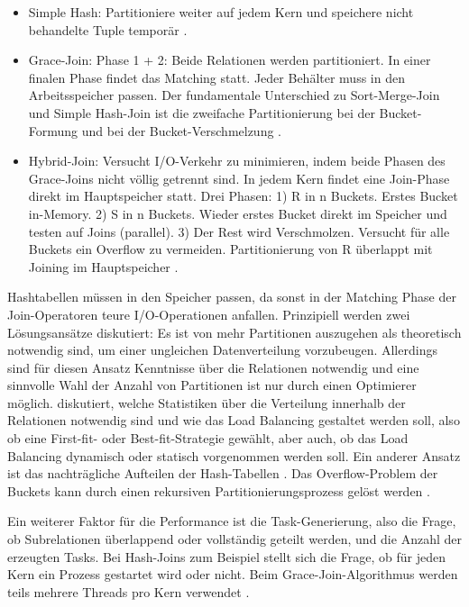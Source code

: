 \documentclass[a4paper,12pt,twoside]{article}
\begin{document}
\begin{itemize}
	\item Simple Hash: Partitioniere weiter auf jedem Kern und speichere nicht behandelte Tuple temporär {\autocite{Lu1994}}.
	\item Grace-Join: Phase 1 + 2: Beide Relationen werden partitioniert. In einer finalen Phase findet das Matching statt. Jeder Behälter muss in den Arbeitsspeicher passen. Der fundamentale Unterschied zu Sort-Merge-Join und Simple Hash-Join ist die zweifache Partitionierung bei der Bucket-Formung und bei der Bucket-Verschmelzung {\autocite{Schneider1989}}.
	\item Hybrid-Join: Versucht I/O-Verkehr zu minimieren, indem beide Phasen des Grace-Joins nicht völlig getrennt sind. In jedem Kern findet eine Join-Phase direkt im Hauptspeicher statt. Drei Phasen: 1) R in n Buckets. Erstes Bucket in-Memory. 2) S in n Buckets. Wieder erstes Bucket direkt im Speicher und testen auf Joins (parallel). 3) Der Rest wird Verschmolzen. Versucht für alle Buckets ein Overflow zu vermeiden. Partitionierung von R überlappt mit Joining im Hauptspeicher {\autocite{Schneider1989}}.
\end{itemize}

Hashtabellen müssen in den Speicher passen, da sonst in der Matching Phase der Join-Operatoren teure I/O-Operationen anfallen. Prinzipiell werden zwei Lösungsansätze diskutiert: Es ist von mehr Partitionen auszugehen als theoretisch notwendig sind, um einer ungleichen Datenverteilung vorzubeugen. Allerdings sind für diesen Ansatz Kenntnisse über die Relationen notwendig und eine sinnvolle Wahl der Anzahl von Partitionen ist nur durch einen Optimierer möglich. {\textcite{Lu1994}} diskutiert, welche Statistiken über die Verteilung innerhalb der Relationen notwendig sind und wie das Load Balancing gestaltet werden soll, also ob eine First-fit- oder Best-fit-Strategie gewählt, aber auch, ob das Load Balancing dynamisch oder statisch vorgenommen werden soll. Ein anderer Ansatz ist das nachträgliche Aufteilen der Hash-Tabellen {\autocite{Mishra1992}}. Das Overflow-Problem der Buckets kann durch einen rekursiven Partitionierungsprozess gelöst werden {\autocite{DeWitt1985}}.

Ein weiterer Faktor für die Performance ist die Task-Generierung, also die Frage, ob Subrelationen überlappend oder vollständig geteilt werden,%
und die Anzahl der erzeugten Tasks. Bei Hash-Joins zum Beispiel stellt sich die Frage, ob für jeden Kern ein Prozess gestartet wird oder nicht. Beim Grace-Join-Algorithmus werden teils mehrere Threads pro Kern verwendet {\autocite{Lu1994}}. 
\end{document}
